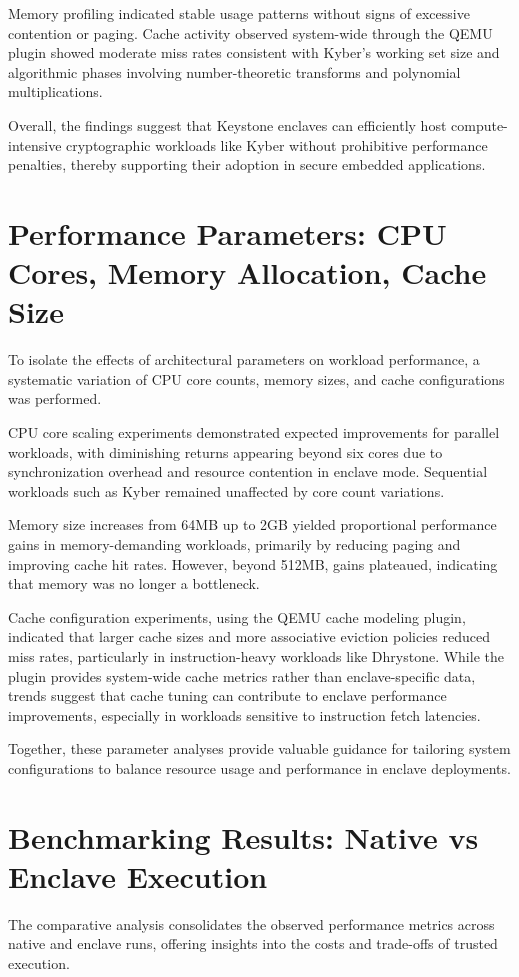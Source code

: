 Memory profiling indicated stable usage patterns without signs of excessive contention or paging. Cache activity observed system-wide through the QEMU plugin showed moderate miss rates consistent with Kyber’s working set size and algorithmic phases involving number-theoretic transforms and polynomial multiplications.

Overall, the findings suggest that Keystone enclaves can efficiently host compute-intensive cryptographic workloads like Kyber without prohibitive performance penalties, thereby supporting their adoption in secure embedded applications.

\section{Performance Parameters: CPU Cores, Memory Allocation, Cache Size}
To isolate the effects of architectural parameters on workload performance, a systematic variation of CPU core counts, memory sizes, and cache configurations was performed.

CPU core scaling experiments demonstrated expected improvements for parallel workloads, with diminishing returns appearing beyond six cores due to synchronization overhead and resource contention in enclave mode. Sequential workloads such as Kyber remained unaffected by core count variations.

Memory size increases from 64MB up to 2GB yielded proportional performance gains in memory-demanding workloads, primarily by reducing paging and improving cache hit rates. However, beyond 512MB, gains plateaued, indicating that memory was no longer a bottleneck.

Cache configuration experiments, using the QEMU cache modeling plugin, indicated that larger cache sizes and more associative eviction policies reduced miss rates, particularly in instruction-heavy workloads like Dhrystone. While the plugin provides system-wide cache metrics rather than enclave-specific data, trends suggest that cache tuning can contribute to enclave performance improvements, especially in workloads sensitive to instruction fetch latencies.

Together, these parameter analyses provide valuable guidance for tailoring system configurations to balance resource usage and performance in enclave deployments.
\section{Benchmarking Results: Native vs Enclave Execution}
The comparative analysis consolidates the observed performance metrics across native and enclave runs, offering insights into the costs and trade-offs of trusted execution.

